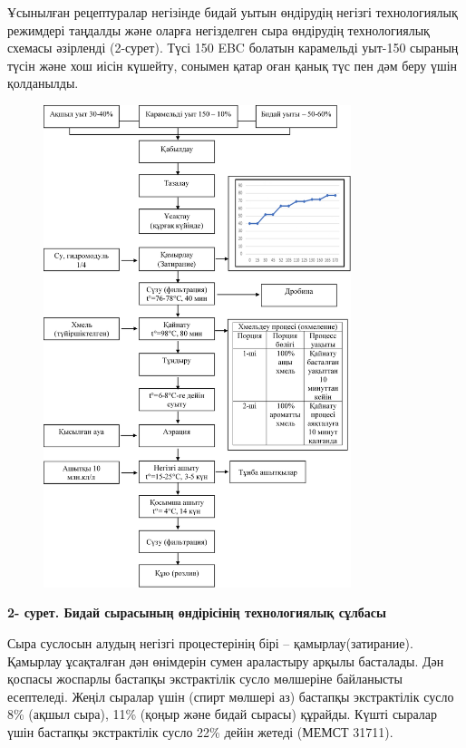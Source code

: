 Ұсынылған рецептуралар негізінде бидай уытын өндірудің негізгі
технологиялық режимдері таңдалды және оларға негізделген сыра өндірудің
технологиялық схемасы әзірленді (2-сурет). Түсі 150 EBC болатын
карамельді уыт-150 сыраның түсін және хош иісін күшейту, сонымен қатар
оған қанық түс пен дәм беру үшін қолданылды.

\begin{figure}[H]
	\centering
	\includegraphics[width=0.8\textwidth]{media/pish3/image5}
	\caption*{}
\end{figure}


{\bfseries 2- сурет. Бидай сырасының өндірісінің технологиялық сұлбасы}

Сыра суслосын алудың негізгі процестерінің бірі -- қамырлау(затирание).
Қамырлау ұсақталған дән өнімдерін сумен араластыру арқылы басталады. Дән
қоспасы жоспарлы бастапқы экстрактілік сусло мөлшеріне байланысты
есептеледі. Жеңіл сыралар үшін (спирт мөлшері аз) бастапқы экстрактілік
сусло 8\% (ақшыл сыра), 11\% (қоңыр және бидай сырасы) құрайды. Күшті
сыралар үшін бастапқы экстрактілік сусло 22\% дейін жетеді (МЕМСТ
31711).

